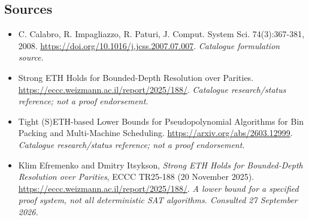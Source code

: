 \documentclass[11pt,a4paper]{article}
\numberwithin{equation}{section}
\begin{document}
\subsection{Sources}
\begin{itemize}\raggedright
\item[\textnormal{[S1]}]\hypertarget{source:30006704:1}{} C. Calabro, R. Impagliazzo, R. Paturi, J. Comput. System Sci. 74(3):367-381, 2008.
\url{https://doi.org/10.1016/j.jcss.2007.07.007}.
{\small\textit{Catalogue formulation source.}}
\item[\textnormal{[S2]}]\hypertarget{source:30006704:2}{} Strong ETH Holds for Bounded-Depth Resolution over Parities.
\url{https://eccc.weizmann.ac.il/report/2025/188/}.
{\small\textit{Catalogue research/status reference; not a proof endorsement.}}
\item[\textnormal{[S3]}]\hypertarget{source:30006704:3}{} Tight (S)ETH-based Lower Bounds for Pseudopolynomial Algorithms for Bin Packing and Multi-Machine Scheduling.
\url{https://arxiv.org/abs/2603.12999}.
{\small\textit{Catalogue research/status reference; not a proof endorsement.}}

\item[\textnormal{[E1]}]\hypertarget{extra:30006704:1}{} Klim Efremenko and Dmitry Itsykson, \emph{Strong ETH Holds for Bounded-Depth Resolution over Parities}, ECCC TR25-188 (20 November 2025).
\url{https://eccc.weizmann.ac.il/report/2025/188/}.
{\small\textit{A lower bound for a specified proof system, not all deterministic SAT algorithms. Consulted 27 September 2026.}}
\end{itemize}
\end{document}
